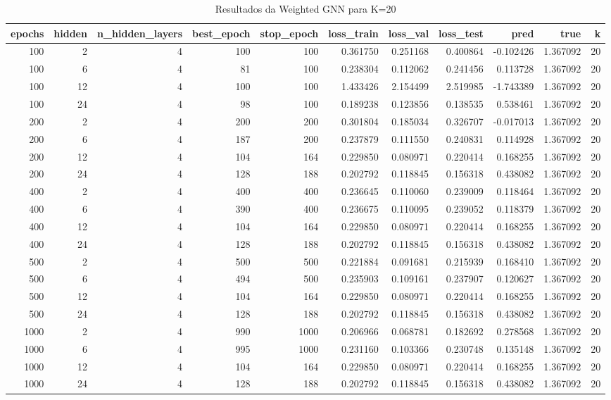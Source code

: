 \begin{table}
\caption{Resultados da Weighted GNN para K=20}
\label{tab:weighted_gnn_results_k20}
\begin{tabular}{rrrrrrrrrrr}
\toprule
epochs & hidden & n\_hidden\_layers & best\_epoch & stop\_epoch & loss\_train & loss\_val & loss\_test & pred & true & k \\
\midrule
100 & 2 & 4 & 100 & 100 & 0.361750 & 0.251168 & 0.400864 & -0.102426 & 1.367092 & 20 \\
100 & 6 & 4 & 81 & 100 & 0.238304 & 0.112062 & 0.241456 & 0.113728 & 1.367092 & 20 \\
100 & 12 & 4 & 100 & 100 & 1.433426 & 2.154499 & 2.519985 & -1.743389 & 1.367092 & 20 \\
100 & 24 & 4 & 98 & 100 & 0.189238 & 0.123856 & 0.138535 & 0.538461 & 1.367092 & 20 \\
200 & 2 & 4 & 200 & 200 & 0.301804 & 0.185034 & 0.326707 & -0.017013 & 1.367092 & 20 \\
200 & 6 & 4 & 187 & 200 & 0.237879 & 0.111550 & 0.240831 & 0.114928 & 1.367092 & 20 \\
200 & 12 & 4 & 104 & 164 & 0.229850 & 0.080971 & 0.220414 & 0.168255 & 1.367092 & 20 \\
200 & 24 & 4 & 128 & 188 & 0.202792 & 0.118845 & 0.156318 & 0.438082 & 1.367092 & 20 \\
400 & 2 & 4 & 400 & 400 & 0.236645 & 0.110060 & 0.239009 & 0.118464 & 1.367092 & 20 \\
400 & 6 & 4 & 390 & 400 & 0.236675 & 0.110095 & 0.239052 & 0.118379 & 1.367092 & 20 \\
400 & 12 & 4 & 104 & 164 & 0.229850 & 0.080971 & 0.220414 & 0.168255 & 1.367092 & 20 \\
400 & 24 & 4 & 128 & 188 & 0.202792 & 0.118845 & 0.156318 & 0.438082 & 1.367092 & 20 \\
500 & 2 & 4 & 500 & 500 & 0.221884 & 0.091681 & 0.215939 & 0.168410 & 1.367092 & 20 \\
500 & 6 & 4 & 494 & 500 & 0.235903 & 0.109161 & 0.237907 & 0.120627 & 1.367092 & 20 \\
500 & 12 & 4 & 104 & 164 & 0.229850 & 0.080971 & 0.220414 & 0.168255 & 1.367092 & 20 \\
500 & 24 & 4 & 128 & 188 & 0.202792 & 0.118845 & 0.156318 & 0.438082 & 1.367092 & 20 \\
1000 & 2 & 4 & 990 & 1000 & 0.206966 & 0.068781 & 0.182692 & 0.278568 & 1.367092 & 20 \\
1000 & 6 & 4 & 995 & 1000 & 0.231160 & 0.103366 & 0.230748 & 0.135148 & 1.367092 & 20 \\
1000 & 12 & 4 & 104 & 164 & 0.229850 & 0.080971 & 0.220414 & 0.168255 & 1.367092 & 20 \\
1000 & 24 & 4 & 128 & 188 & 0.202792 & 0.118845 & 0.156318 & 0.438082 & 1.367092 & 20 \\
\bottomrule
\end{tabular}
\end{table}
